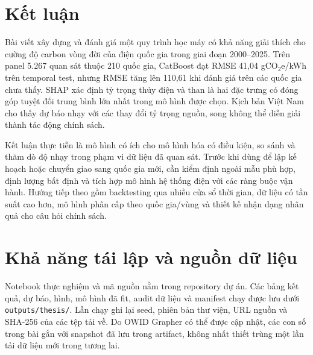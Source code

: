 \documentclass[11pt,a4paper]{article}
\begin{document}
\section{Kết luận}

Bài viết xây dựng và đánh giá một quy trình học máy có khả năng giải thích cho
cường độ carbon vòng đời của điện quốc gia trong giai đoạn 2000--2025. Trên
panel 5.267 quan sát thuộc 210 quốc gia, CatBoost đạt RMSE 41,04
gCO$_2$e/kWh trên temporal test, nhưng RMSE tăng lên 110,61 khi đánh giá trên
các quốc gia chưa thấy. SHAP xác định tỷ trọng thủy điện và than là hai đặc
trưng có đóng góp tuyệt đối trung bình lớn nhất trong mô hình được chọn.
Kịch bản Việt Nam cho thấy dự báo nhạy với các thay đổi tỷ trọng nguồn, song
không thể diễn giải thành tác động chính sách.

Kết luận thực tiễn là mô hình có ích cho mô hình hóa có điều kiện, so sánh và
thăm dò độ nhạy trong phạm vi dữ liệu đã quan sát. Trước khi dùng để lập kế
hoạch hoặc chuyển giao sang quốc gia mới, cần kiểm định ngoài mẫu phù hợp,
định lượng bất định và tích hợp mô hình hệ thống điện với các ràng buộc vận
hành. Hướng tiếp theo gồm backtesting qua nhiều cửa sổ thời gian, dữ liệu có
tần suất cao hơn, mô hình phân cấp theo quốc gia/vùng và thiết kế nhận dạng
nhân quả cho câu hỏi chính sách.

\section*{Khả năng tái lập và nguồn dữ liệu}

Notebook thực nghiệm và mã nguồn nằm trong repository dự án. Các bảng kết
quả, dự báo, hình, mô hình đã fit, audit dữ liệu và manifest chạy được lưu
dưới \texttt{outputs/thesis/}. Lần chạy ghi lại seed, phiên bản thư viện, URL
nguồn và SHA-256 của các tệp tải về. Do OWID Grapher có thể được cập nhật,
các con số trong bài gắn với snapshot đã lưu trong artifact, không nhất thiết
trùng một lần tải dữ liệu mới trong tương lai.



\end{document}
